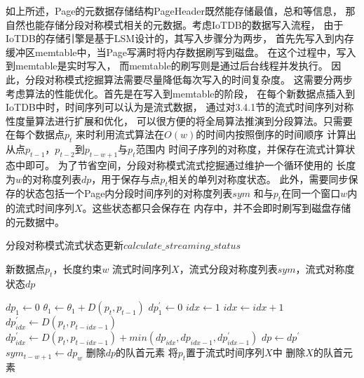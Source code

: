 如上所述，Page的元数据存储结构PageHeader既然能存储最值，总和等信息，
那自然也能存储分段对称模式相关的元数据。考虑IoTDB的数据写入流程，
由于IoTDB的存储引擎是基于LSM\cite{DBLP:journals/vldb/LuoC20}设计的，其写入步骤分为两步，
首先先写入到内存缓冲区memtable中，当Page写满时将内存数据刷写到磁盘。
在这个过程中，写入到memtable是实时写入，
而memtable的刷写则是通过后台线程并发执行。
因此，分段对称模式挖掘算法需要尽量降低每次写入的时间复杂度。
这需要分两步考虑算法的性能优化。首先是在写入到memtable的阶段，
在每个新数据点插入到IoTDB中时，时间序列可以认为是流式数据，
通过对3.4.1节的流式时间序列对称性度量算法进行扩展和优化，
可以很方便的将全局算法推演到分段算法。只需要在每个数据点$p_t$
来时利用流式算法在$O(w)$的时间内按照倒序的时间顺序
计算出从点$p_{t-1}$，$p_{t-2}$到$p_{t-w+1}$与$p_t$范围内
时间子序列的对称度，并保存在流式计算状态中即可。
为了节省空间，分段对称模式流式挖掘通过维护一个循环使用的
长度为$w$的对称度列表$dp$，用于保存与点$p_t$相关的单列对称度状态。
此外，需要同步保存的状态包括一个Page内分段时间序列的对称度列表$sym$
和与$p_t$在同一个窗口$w$内的流式时间序列$X$。这些状态都只会保存在
内存中，并不会即时刷写到磁盘存储的元数据中。

\renewcommand{\algorithmicrequire}{\textbf{输入：}\unskip}
\renewcommand{\algorithmicensure}{\textbf{输出：}\unskip}

\begin{algorithm}
  \caption{分段对称模式流式状态更新$calculate\_streaming\_status$}
  \label{alg:iotdb_streaming}
  \small
  \begin{algorithmic}
    \REQUIRE 新数据点$p_t$，长度约束$w$
    \ENSURE 流式时间序列$X$，流式分段对称度列表$sym$，流式对称度状态$dp$

        \STATE $dp_{1} \leftarrow 0$
    \ELSE
      \STATE $\theta_1 \leftarrow \theta_1 + D\left(p_{t}, p_{t-1}\right)$
      \STATE $dp_1^{\prime} \leftarrow 0$
      \STATE $ idx \leftarrow 1$
        \STATE $ idx \leftarrow idx+1$
          \STATE $dp_{idx}^{\prime} \leftarrow D\left(p_{t}, p_{t-idx-1}\right)$
        \ELSE
          \STATE $dp_{idx}^{\prime} \leftarrow D\left(p_{t}, p_{t-idx-1}\right)+min(dp_{idx},dp_{idx-1},dp_{idx-1}^{\prime})$
        \ENDIF
      \ENDWHILE
      \STATE $ dp \leftarrow dp^{\prime}$
        \STATE $sym_{t-w+1} \leftarrow dp_{w}$
        \STATE 删除$dp$的队首元素
      \ENDIF
    \ENDIF
    \STATE 将$p_t$置于流式时间序列$X$中
      \STATE 删除$X$的队首元素
    \ENDIF
  \end{algorithmic}
\end{algorithm}

